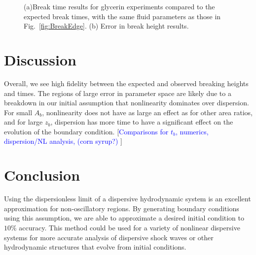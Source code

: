 \documentclass{jfm}
\newcommand{\MM}[1]{[\textcolor{blue}{#1 }]}
\begin{document}
\begin{figure}
\centering
{}
\caption{(a)Break time results for glycerin experiments compared to the expected break times, with the same fluid parameters as those in Fig.~\ref{fig:BreakEdge}. (b) Error in break height results.}
\label{fig:BreakTimeGlycerin}
\end{figure}  

\section{Discussion}\label{sec:Dis}
    Overall, we see high fidelity between the expected and observed breaking heights and times. The regions of large error in parameter space are likely due to a breakdown in our initial assumption that nonlinearity dominates over dispersion. For small $A_b$, nonlinearity does not have as large an effect as for other area ratios, and for large $z_b$, dispersion has more time to have a significant effect on the evolution of the boundary condition. \MM{Comparisons for $t_b$, numerics, dispersion/NL analysis, (corn syrup?)}

\section{Conclusion}\label{sec:Con}
    Using the dispersionless limit of a dispersive hydrodynamic system is an excellent approximation for non-oscillatory regions. By generating boundary conditions using this assumption, we are able to approximate a desired initial condition to $10\% $ accuracy. This method could be used for a variety of nonlinear dispersive systems for more accurate analysis of dispersive shock waves or other hydrodynamic structures that evolve from initial conditions.



\end{document}
